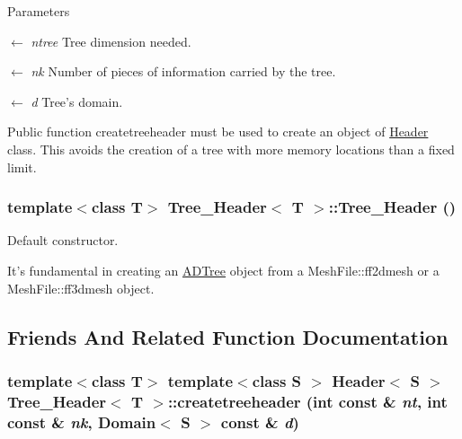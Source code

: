 \begin{DoxyParams}{Parameters}
\item[\mbox{$\leftarrow$} {\em ntree}]Tree dimension needed. \item[\mbox{$\leftarrow$} {\em nk}]Number of pieces of information carried by the tree. \item[\mbox{$\leftarrow$} {\em d}]Tree's domain.\end{DoxyParams}
Public function createtreeheader must be used to create an object of \hyperlink{classHeader}{Header} class. This avoids the creation of a tree with more memory locations than a fixed limit. \hypertarget{classTree__Header_afd804e3208294dabc6f24f597133ec29}{
\subsubsection[{Tree\_\-Header}]{\setlength{\rightskip}{0pt plus 5cm}template$<$class T$>$ {\bf Tree\_\-Header}$<$ T $>$::{\bf Tree\_\-Header} ()}}
\label{classTree__Header_afd804e3208294dabc6f24f597133ec29}
Default constructor.

It's fundamental in creating an \hyperlink{classADTree}{ADTree} object from a MeshFile::ff2dmesh or a MeshFile::ff3dmesh object. 

\subsection{Friends And Related Function Documentation}
\hypertarget{classTree__Header_a0b108322f91afa71aae8698e1da6cda8}{
\subsubsection[{createtreeheader}]{\setlength{\rightskip}{0pt plus 5cm}template$<$class T$>$ template$<$class S $>$ {\bf Header}$<$ S $>$ {\bf Tree\_\-Header}$<$ T $>$::createtreeheader (int const \& {\em nt}, \/  int const \& {\em nk}, \/  {\bf Domain}$<$ S $>$ const \& {\em d})}}
\label{classTree__Header_a0b108322f91afa71aae8698e1da6cda8}



